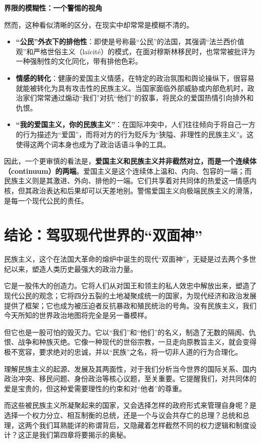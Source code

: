 \textbf{界限的模糊性：一个警惕的视角}

然而，这种看似清晰的区分，在现实中却常常是模糊不清的。
\begin{itemize}[noitemsep,topsep=0pt]
    \item \textbf{“公民”外衣下的排他性}：即使是号称最“公民”的法国，其强调“法兰西价值观”和严格世俗主义（laïcité）的模式，在面对穆斯林移民时，也常常被批评为一种强制性的文化同化，带有排他色彩。
    \item \textbf{情感的转化}：健康的爱国主义情感，在特定的政治氛围和舆论操纵下，很容易就能被转化为具有攻击性的民族主义。当国家面临外部威胁或内部危机时，政治家们常常通过煽动“我们”对抗“他们”的叙事，将民众的爱国热情引向排外和仇恨。
    \item \textbf{“我的爱国主义，你的民族主义”}：在国际冲突中，人们往往倾向于将自己一方的行为描述为“爱国”，而将对方的行为贬斥为“狭隘、非理性的民族主义”。这使得这两个词本身也成为了政治话语斗争的工具。
\end{itemize}

因此，一个更审慎的看法是，\textbf{爱国主义和民族主义并非截然对立，而是一个连续体（continuum）的两端}。爱国主义是这个连续体上温和、内向、包容的一端；而民族主义则是其激进、外向、排他的一端。它们共享着对共同体的热爱这一情感内核，但其政治表达和后果却可以天差地别。警惕爱国主义向极端民族主义的滑落，是每一个现代公民的责任。

\hrulefill

\section{结论：驾驭现代世界的“双面神”}

民族主义，这个在法国大革命的熔炉中诞生的现代“双面神”，无疑是过去两个多世纪以来，塑造人类历史最强大的政治力量。

它是一股伟大的创造力。它将人们从对国王和领主的私人效忠中解放出来，塑造了现代公民的观念；它将四分五裂的土地凝聚成统一的国家，为现代经济和政治发展提供了框架；它也成为被压迫者反抗暴政和殖民统治的号角。没有民族主义，我们今天所知的世界政治地图将完全是另一番模样。

但它也是一股可怕的毁灭力。它以“我们”和“他们”的名义，制造了无数的隔阂、仇恨、战争和种族灭绝。它像一种现代的世俗宗教，一旦走向原教旨主义，就会变得极不宽容，要求绝对的忠诚，并以“民族”之名，将一切非人道的行为合理化。

理解民族主义的起源、发展及其两面性，对于我们分析当今世界的国际关系、国内政治冲突、移民问题、身份政治等核心议题，至关重要。它提醒我们，对共同体的爱是宝贵的，但这种爱需要理性的约束和对“他者”的尊重。

而这些被民族主义所凝聚起来的国家，又会选择怎样的政府形式来管理自身呢？是选择一个权力分立、相互制衡的总统，还是一个与议会共存亡的总理？总统和总理，这两个我们耳熟能详的称谓背后，又隐藏着怎样截然不同的权力逻辑和制度设计？这正是我们第四章将要揭示的奥秘。
